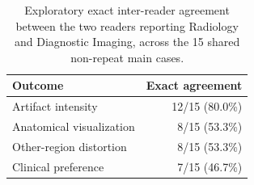 \begin{table}[htbp]
    \centering
    \small
    \caption[Exact inter-reader agreement between radiologists]{Exploratory exact inter-reader agreement between the two readers reporting Radiology and Diagnostic Imaging, across the 15 shared non-repeat main cases.}
    \label{tab:appendix-radiologist-agreement}
    \begin{tabular}{lr}
        \toprule
        Outcome & Exact agreement \\
        \midrule
        Artifact intensity & 12/15 (80.0\%) \\
        Anatomical visualization & 8/15 (53.3\%) \\
        Other-region distortion & 8/15 (53.3\%) \\
        Clinical preference & 7/15 (46.7\%) \\
        \bottomrule
    \end{tabular}
\end{table}
